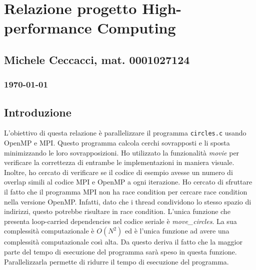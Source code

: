 \documentclass[a4paper,11pt, twoside]{report}
\begin{document}
\section*{Relazione progetto High-performance Computing}
\subsection*{Michele Ceccacci, mat. 0001027124}
\subsubsection*{\today}

\subsection*{Introduzione}
L'obiettivo di questa relazione è parallelizzare il programma \texttt{circles.c} usando OpenMP e MPI.
Questo programma calcola cerchi sovrapposti e li sposta minimizzando le loro sovrapposizioni.
Ho utilizzato la funzionalità \textit{movie} per verificare la correttezza di entrambe le implementazioni in maniera visuale. 
Inoltre, ho cercato di verificare se il codice di esempio avesse un numero di overlap simili al codice MPI e OpenMP a ogni iterazione.
Ho cercato di sfruttare il fatto che il programma MPI non ha race condition per cercare race condition nella versione OpenMP. Infatti, dato che i thread condividono lo stesso spazio di indirizzi, questo potrebbe risultare in race condition. L'unica funzione che presenta loop-carried dependencies nel codice seriale è \textit{move\_circles}. La sua complessità computazionale è $O(N^2)$ ed è l'unica funzione ad avere una complessità computazionale così alta. Da questo deriva il fatto che la maggior parte del tempo di esecuzione del programma sarà speso in questa funzione.
Parallelizzarla permette di ridurre il tempo di esecuzione del programma.
\end{document}
